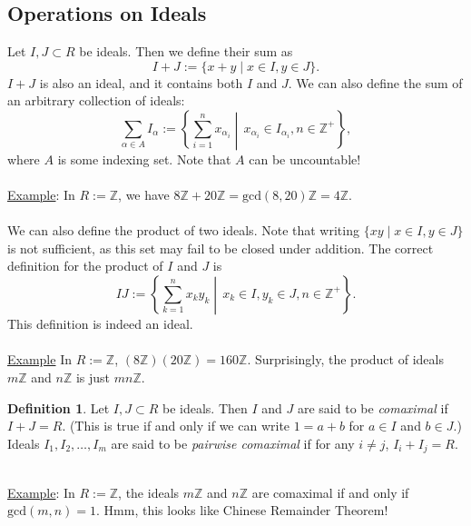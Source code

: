 \documentclass[12pt]{article}
\newcommand{\z}{\mathbb{Z}}
\newcommand{\ita}[1]{\textit{#1}}
\theoremstyle{definition}
\newtheorem{definition}[theorem]{Definition}
\begin{document}
\subsection{Operations on Ideals}
Let $I,J\subset R$ be ideals. Then we define their sum as
\begin{equation}
    I+J:=\{x+y\mid x\in I,y\in J\}.
\end{equation}
$I+J$ is also an ideal, and it contains both $I$ and $J$. We can also define the sum of an arbitrary collection of ideals:
\begin{equation}
    \sum\limits_{\alpha\in A}I_{\alpha}:=\left\{\sum\limits_{i=1}^nx_{\alpha_i}\middle|\,x_{\alpha_i}\in I_{\alpha_i},n\in\z^+\right\},
\end{equation}
where $A$ is some indexing set. Note that $A$ can be uncountable!\\\\
\underline{Example}: In $R:=\z$, we have $8\z+20\z=\text{gcd}(8,20)\z=4\z$.\\\\
We can also define the product of two ideals. Note that writing $\{xy\mid x\in I,y\in J\}$ is not sufficient, as this set may fail to be closed under addition. The correct definition for the product of $I$ and $J$ is
\begin{equation}
    IJ:=\left\{\sum\limits_{k=1}^nx_ky_k\middle|\,x_k\in I,y_k\in J,n\in\z^+\right\}.
\end{equation}
This definition is indeed an ideal.\\\\
\underline{Example} In $R:=\z$, $(8\z)(20\z)=160\z$. Surprisingly, the product of ideals $m\z$ and $n\z$ is just $mn\z$.
\begin{definition}
    Let $I,J\subset R$ be ideals. Then $I$ and $J$ are said to be \ita{comaximal} if $I+J=R$. (This is true if and only if we can write $1=a+b$ for $a\in I$ and $b\in J$.) Ideals $I_1,I_2,\dotsc,I_m$ are said to be \ita{pairwise comaximal} if for any $i\neq j$, $I_i+I_j=R$.
\end{definition} $ $\\
\underline{Example}: In $R:=\z$, the ideals $m\z$ and $n\z$ are comaximal if and only if $\text{gcd}(m,n)=1$. Hmm, this looks like Chinese Remainder Theorem!
\end{document}
